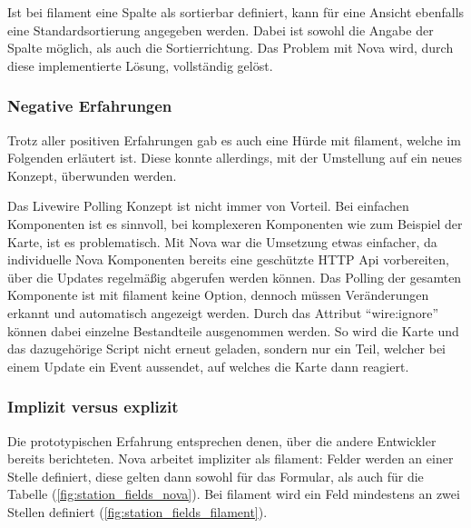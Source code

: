 Ist bei filament eine Spalte als sortierbar definiert, kann für eine Ansicht ebenfalls eine Standardsortierung angegeben werden.
Dabei ist sowohl die Angabe der Spalte möglich, als auch die Sortierrichtung.
Das Problem mit Nova wird, durch diese implementierte Lösung, vollständig gelöst.

\subsubsection{Negative Erfahrungen}
Trotz aller positiven Erfahrungen gab es auch eine Hürde mit filament, welche im Folgenden erläutert ist.
Diese konnte allerdings, mit der Umstellung auf ein neues Konzept, überwunden werden.

Das Livewire Polling Konzept ist nicht immer von Vorteil.
Bei einfachen Komponenten ist es sinnvoll, bei komplexeren Komponenten wie zum Beispiel der Karte, ist es problematisch.
Mit Nova war die Umsetzung etwas einfacher, da individuelle Nova Komponenten bereits eine geschützte HTTP Api vorbereiten, über die Updates regelmäßig abgerufen werden können.
Das Polling der gesamten Komponente ist mit filament keine Option, dennoch müssen Veränderungen erkannt und automatisch angezeigt werden.
Durch das Attribut \enquote{wire:ignore} können dabei einzelne Bestandteile ausgenommen werden.
So wird die Karte und das dazugehörige Script nicht erneut geladen, sondern nur ein Teil, welcher bei einem Update ein Event aussendet, auf welches die Karte dann reagiert.

\newpage

\subsubsection{Implizit versus explizit}
Die prototypischen Erfahrung entsprechen denen, über die andere Entwickler\cite{reddit-laravel-nova-vs-filament} bereits berichteten.
Nova arbeitet impliziter als filament:
Felder werden an einer Stelle definiert, diese gelten dann sowohl für das Formular, als auch für die Tabelle (\ref{fig:station_fields_nova}).
Bei filament wird ein Feld mindestens an zwei Stellen definiert (\ref{fig:station_fields_filament}).

